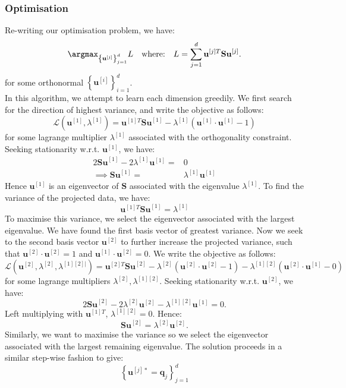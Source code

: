 \subsubsection{Optimisation}
Re-writing our optimisation problem, we have:
\[\argmax_{{\left\{ \mathbf{u}^{[j]} \right\}}_{j=1}^{d}}L\quad\text{where:}\quad L=\sum_{j=1}^{d} \mathbf{u}^{[j]T}\mathbf{Su}^{[j]}.\]
for some orthonormal ${\left\{ \mathbf{u}^{[i]} \right\}}^{d}_{i=1}$.\\
In this algorithm, we attempt to learn each dimension greedily.
We first search for the direction of highest variance, and write the objective
as follows:
\[\mathcal{L}(\mathbf{u}^{[1]},\lambda^{[1]})=\mathbf{u}^{[1]T}\mathbf{Su}^{[1]}-\lambda^{[1]}\left( \mathbf{u}^{[1]}\cdot\mathbf{u}^{[1]}-1 \right)\] 
for some lagrange multiplier $\lambda^{[1]}$ associated with the orthogonality
constraint. Seeking stationarity w.r.t. $\mathbf{u}^{[1]}$, we have:
\begin{align*}
  2\mathbf{Su}^{[1]}-2\lambda^{[1]}\mathbf{u}^{[1]}=&0\\
  \implies\mathbf{Su}^{[1]}=&\lambda^{[1]}\mathbf{u}^{[1]}
\end{align*}
Hence $\mathbf{u}^{[1]}$ is an eigenvector of $\mathbf{S}$ associated with the
eigenvalue $\lambda^{[1]}$.  To find the variance of the projected data, we
have:
\[\mathbf{u}^{[1]T}\mathbf{Su}^{[1]}=\lambda^{[1]}\] 
To maximise this variance, we select the eigenvector associated with the
largest eigenvalue. We have found the first basis vector of greatest variance.
Now we seek to the second basis vector $\mathbf{u}^{[2]}$ to further increase
the projected variance, such that $\mathbf{u}^{[2]}\cdot \mathbf{u}^{[2]}=1$
and $\mathbf{u}^{[1]}\cdot \mathbf{u}^{[2]}=0$. We write the objective as
follows:
\[\mathcal{L}(\mathbf{u}^{[2]},\lambda^{[2]},\lambda^{[1][2]|})=\mathbf{u}^{[2]T}\mathbf{Su}^{[2]}-\lambda^{[2]}\left( \mathbf{u}^{[2]}\cdot\mathbf{u}^{[2]}-1 \right)-\lambda^{[1][2]}\left( \mathbf{u}^{[2]}\cdot\mathbf{u}^{[1]} -0\right) \] 
for some lagrange multipliers $\lambda^{[2]}, \lambda^{[1][2]}$. Seeking
stationarity w.r.t. $\mathbf{u}^{[2]}$, we have:
\[2\mathbf{Su}^{[2]}-2\lambda^{[2]}\mathbf{u}^{[2]}-\lambda^{[1][2]}\mathbf{u}^{[1]}=0.\] 
Left multiplying with $\mathbf{u}^{[1]T}$, $\lambda^{[1][2]}=0$.
Hence:
\[\mathbf{Su}^{[2]}=\lambda^{[2]}\mathbf{u}^{[2]}.\] 
Similarly, we want to maximise the variance so we select the eigenvector
associated with the largest remaining eigenvalue. The solution proceeds in a
similar step-wise fashion to give:
\[{\left\{ \mathbf{u}^{[j]*}=\mathbf{q}_j \right\}}_{j=1}^{d}\]

